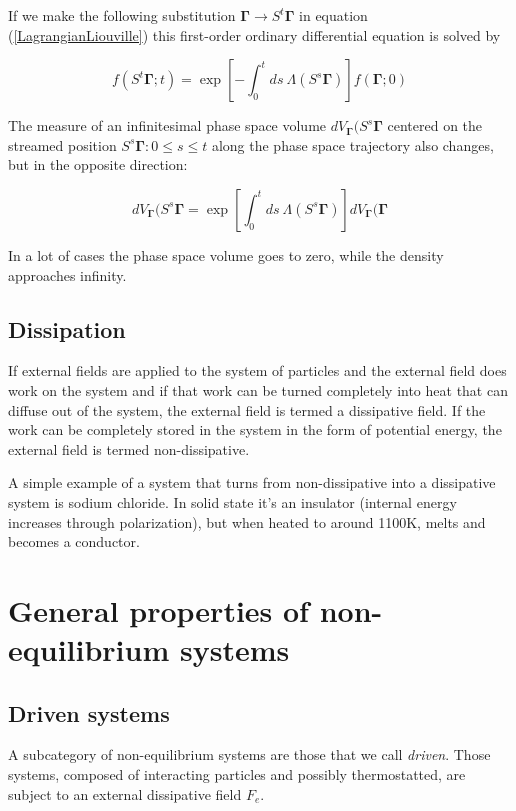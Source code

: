 \documentclass[a4paper,12pt,nofootinbib]{article}
\begin{document}
If we make the following substitution $\bm{\Gamma} \to S^t\bm{\Gamma}$ in equation (\ref{LagrangianLiouville}) this first-order ordinary differential equation is solved by

\begin{equation}
  f(S^t\bm{\Gamma};t)=\exp[-\int_0^t ds\ \Lambda(S^s\bm{\Gamma})]f(\bm{\Gamma};0)
\end{equation}

The measure of an infinitesimal phase space volume $dV_{\bm{\Gamma}}(S^s \bm{\Gamma}$ centered on the streamed position $S^s\bm{\Gamma} : 0 \leq s \leq t $ along the phase space trajectory also changes, but in the opposite direction:

\begin{equation}
  dV_{\bm{\Gamma}}(S^s \bm{\Gamma} =\exp[\int_0^t ds\ \Lambda(S^s\bm{\Gamma})]dV_{\bm{\Gamma}}(\bm{\Gamma}
\end{equation}
 
In a lot of cases the phase space volume goes to zero, while the density approaches infinity.
\subsection{Dissipation}

If external fields are applied to the system of particles and the external field does work on the system and if that work can be turned completely into heat that can diffuse out of the system, the external field is termed a dissipative field. If the work can be completely stored in the system in the form of potential energy, the external field is termed non-dissipative.

A simple example of a system that turns from non-dissipative into a dissipative system is sodium chloride. In solid state it's an insulator (internal energy increases through polarization), but when heated to around 1100K, melts and becomes a conductor.

\section{General properties of non-equilibrium systems}

\subsection{Driven systems}

A subcategory of non-equilibrium systems are those that we call \textit{driven}.
Those systems, composed of interacting particles and possibly thermostatted, are subject to an external dissipative field $F_e$.
\end{document}
